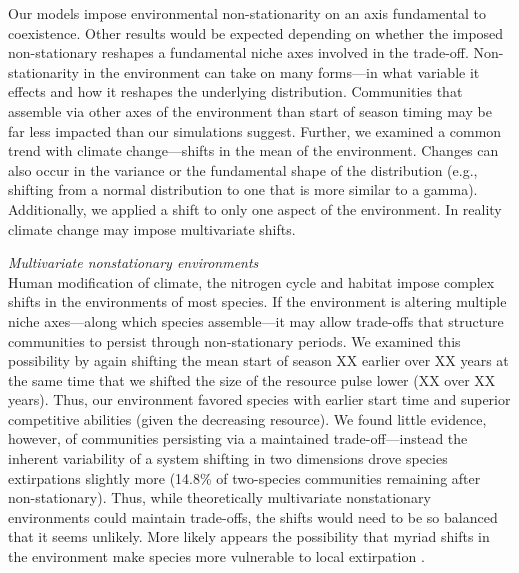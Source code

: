 \documentclass[11pt,letterpaper]{article}
\begin{document}
Our models impose environmental non-stationarity on an axis fundamental to coexistence. Other results would be expected depending on whether the imposed non-stationary reshapes a fundamental niche axes involved in the trade-off. Non-stationarity in the environment can take on many forms---in what variable it effects and how it reshapes the underlying distribution. Communities that assemble via other axes of the environment than start of season timing may be far less impacted than our simulations suggest. Further, we examined a common trend with climate change---shifts in the mean of the environment. Changes can also occur in the variance or the fundamental shape of the distribution (e.g., shifting from a normal distribution to one that is more similar to a gamma). Additionally, we applied a shift to only one aspect of the environment. In reality climate change may impose multivariate shifts.

\emph{Multivariate nonstationary environments}\\
Human modification of climate, the nitrogen cycle and habitat impose complex shifts in the environments of most species. If the environment is altering multiple niche axes---along which species assemble---it may allow trade-offs that structure communities to persist through non-stationary periods. We examined this possibility by again shifting the mean start of season XX earlier over XX years at the same time that we shifted the size of the resource pulse lower (XX over XX years). Thus, our environment favored species with earlier start time and superior competitive abilities (given the decreasing resource). We found little evidence, however, of communities persisting via a maintained trade-off---instead the inherent variability of a system shifting in two dimensions drove species extirpations slightly more (14.8\% of two-species communities remaining after non-stationary). Thus, while theoretically multivariate nonstationary environments could maintain trade-offs, the shifts would need to be so balanced that it seems unlikely. More likely appears the possibility that myriad shifts in the environment make species more vulnerable to local extirpation \citep{sixthectinction2011,IPCC:2014sm}.
\end{document}

